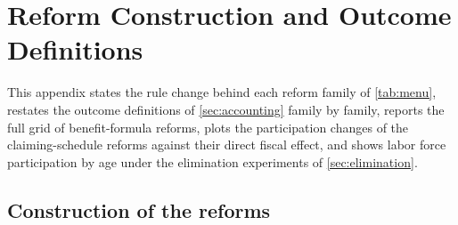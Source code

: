 \providecommand{\cleargradientmacros}{%
  \let\opacity\undefined \let\gradXchange\undefined \let\gradSSpay\undefined \let\gradMVPF\undefined
  \let\gradCost\undefined \let\gradPP\undefined \let\gradMedpay\undefined \let\gradTaxchange\undefined}
\section{Reform Construction and Outcome Definitions}\label{app:reforms}

This appendix states the rule change behind each reform family of \autoref{tab:menu}, restates the outcome definitions of \autoref{sec:accounting} family by family, reports the full grid of benefit-formula reforms, plots the participation changes of the claiming-schedule reforms against their direct fiscal effect, and shows labor force participation by age under the elimination experiments of \autoref{sec:elimination}.

\subsection{Construction of the reforms}\label{app:construction}

